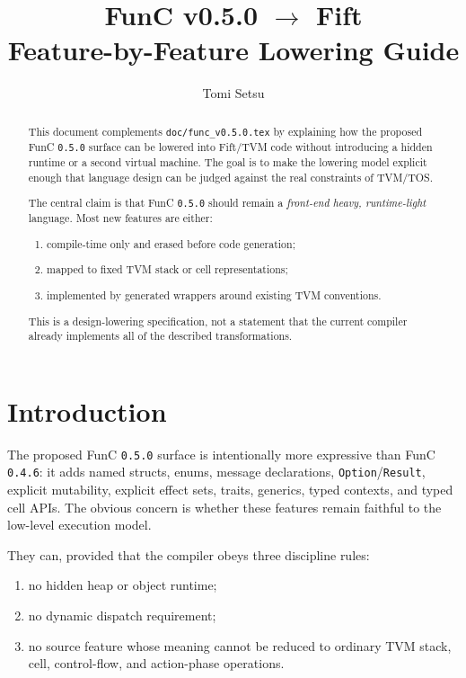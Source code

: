 \documentclass[12pt,oneside]{article}
\title{FunC v0.5.0 $\rightarrow$ Fift\\Feature-by-Feature Lowering Guide}
\author{Tomi Setsu}
\begin{document}
\maketitle

\begin{abstract}
This document complements \verb|doc/func_v0.5.0.tex| by explaining how the
proposed FunC \verb|0.5.0| surface can be lowered into Fift/TVM code without
introducing a hidden runtime or a second virtual machine. The goal is to make
the lowering model explicit enough that language design can be judged against
the real constraints of TVM/TOS.

The central claim is that FunC \verb|0.5.0| should remain a \emph{front-end
heavy, runtime-light} language. Most new features are either:

\begin{enumerate}
\item compile-time only and erased before code generation;
\item mapped to fixed TVM stack or cell representations;
\item implemented by generated wrappers around existing TVM conventions.
\end{enumerate}

This is a design-lowering specification, not a statement that the current
compiler already implements all of the described transformations.
\end{abstract}

\section*{Introduction}
The proposed FunC \verb|0.5.0| surface is intentionally more expressive than
FunC \verb|0.4.6|: it adds named structs, enums, message declarations,
\verb|Option|/\verb|Result|, explicit mutability, explicit effect sets, traits,
generics, typed contexts, and typed cell APIs. The obvious concern is whether
these features remain faithful to the low-level execution model.

They can, provided that the compiler obeys three discipline rules:

\begin{enumerate}
\item no hidden heap or object runtime;
\item no dynamic dispatch requirement;
\item no source feature whose meaning cannot be reduced to ordinary TVM stack,
cell, control-flow, and action-phase operations.
\end{enumerate}
\end{document}
